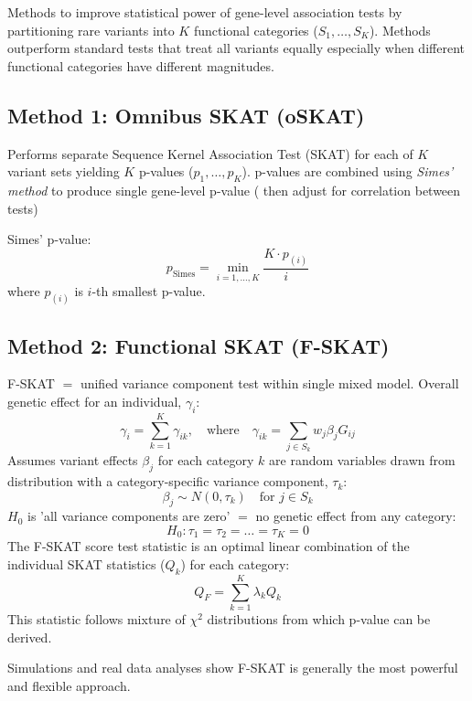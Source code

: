 \documentclass[../main.tex]{subfiles}
\begin{document}
\hrulefill

 \cite{10.1093/bioinformatics/btab083}

Methods to improve statistical power of gene-level association tests by partitioning rare variants into $K$ functional categories ($S_1, \dots, S_K$). Methods outperform standard tests that treat all variants equally especially when different functional categories have different magnitudes.

\subsection*{Method 1: Omnibus SKAT (oSKAT)}

Performs separate Sequence Kernel Association Test (SKAT) for each of $K$ variant sets yielding $K$ p-values ($p_1, \dots, p_K$). p-values are combined using \textit{Simes' method} to produce single gene-level p-value ( then adjust for correlation between tests)

Simes' p-value:
\begin{equation}
p_{\text{Simes}} = \min_{i=1,\dots,K} \frac{K \cdot p_{(i)}}{i}
\end{equation}
where $p_{(i)}$ is $i$-th smallest p-value.

\subsection*{Method 2: Functional SKAT (F-SKAT)}

F-SKAT $=$ unified variance component test within single mixed model. Overall genetic effect for an individual, $\gamma_i$:
\begin{equation}
\gamma_i = \sum_{k=1}^K \gamma_{ik}, \quad \text{where} \quad \gamma_{ik} = \sum_{j \in S_k} w_j \beta_j G_{ij}
\end{equation}
Assumes variant effects $\beta_j$ for each category $k$ are random variables drawn from distribution with a category-specific variance component, $\tau_k$:
\begin{equation}
\beta_j \sim N(0, \tau_k) \quad \text{for } j \in S_k
\end{equation}
$H_0$ is  'all variance components are zero' $=$ no genetic effect from any category:
\begin{equation}
H_0: \tau_1 = \tau_2 = \dots = \tau_K = 0
\end{equation}
The F-SKAT score test statistic is an optimal linear combination of the individual SKAT statistics ($Q_k$) for each category:
\begin{equation}
Q_F = \sum_{k=1}^K \lambda_k Q_k
\end{equation}
This statistic follows mixture of $\chi^2$ distributions from which p-value can be derived.

\hrulefill

Simulations and real data analyses show F-SKAT is generally the most powerful and flexible approach.
\end{document}
